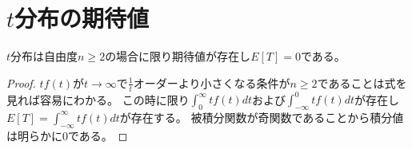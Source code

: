     \section{\texorpdfstring{$t$}{t}分布の期待値}
        \begin{shadebox}
            $t$分布は自由度$n \geq 2$の場合に限り期待値が存在し$E[T] = 0$である。
        \end{shadebox}
        \begin{proof}
            \quad\par
            $tf(t)$が$t \to \infty$で$\frac{1}{t}$オーダーより小さくなる条件が$n \geq 2$であることは式を見れば容易にわかる。
            この時に限り$\int_{0}^{\infty}{tf(t) dt}$および$\int_{-\infty}^{0}{tf(t) dt}$が存在し$E[T] = \int_{-\infty}^{\infty}{tf(t) dt}$が存在する。
            被積分関数が奇関数であることから積分値は明らかに0である。
        \end{proof}
